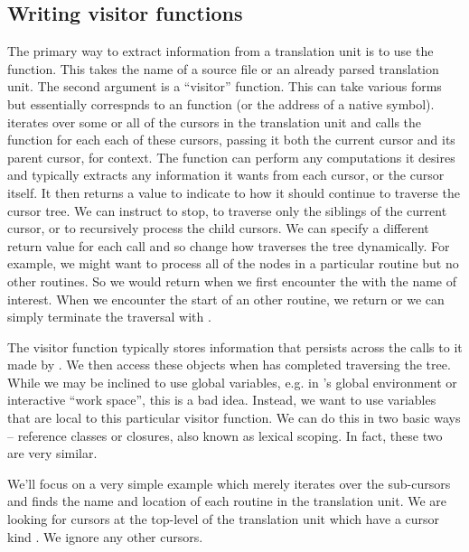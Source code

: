 \subsection{Writing visitor functions}


The primary way to extract information from a translation unit is to
use the  function.  This takes the name of a source
file or an already parsed translation unit.  The second argument is a
``visitor'' function.  This can take various forms but
essentially correspnds to an \R{} function (or the address of a native
symbol).  \libclang{} iterates over some or all of the cursors in the
translation unit and calls the \R{} function for each each of these
cursors, passing it both the current cursor and its parent cursor, for
context.  The function can perform any computations it desires and
typically extracts any information it wants from each cursor, or the
cursor itself.
It then returns a
value to indicate to \libclang{} how it should continue to traverse
the cursor tree.  We can instruct \libclang{} to stop, to traverse
only the siblings of the current cursor, or to recursively process the
child cursors.  We can specify a different return value for each call
and so change how \libclang{} traverses the tree dynamically.  For
example, we might want to process all of the nodes in a particular
routine but no other routines. So we would return
 when we first encounter the %
with the name of interest.  When we encounter the start of an other routine, we return
 or we can simply terminate the traversal with
.

The visitor function typically stores information that persists across
the calls to it made by \libclang.  We then access these objects when
\libclang{} has completed traversing the tree.  While we may be
inclined to use global variables, e.g. in \R{}'s global environment or
interactive ``work space'', this is a bad idea.  Instead, we want to
use variables that are local to this particular visitor function.  We
can do this in two basic ways -- reference classes or closures, also
known as lexical scoping.  In fact, these two are very similar.

We'll focus on a very simple example which merely
iterates over the sub-cursors and finds the name and location of each
routine in the translation unit.  We are looking for cursors at the
top-level of the translation unit which have a cursor kind
.  We ignore any other cursors.


